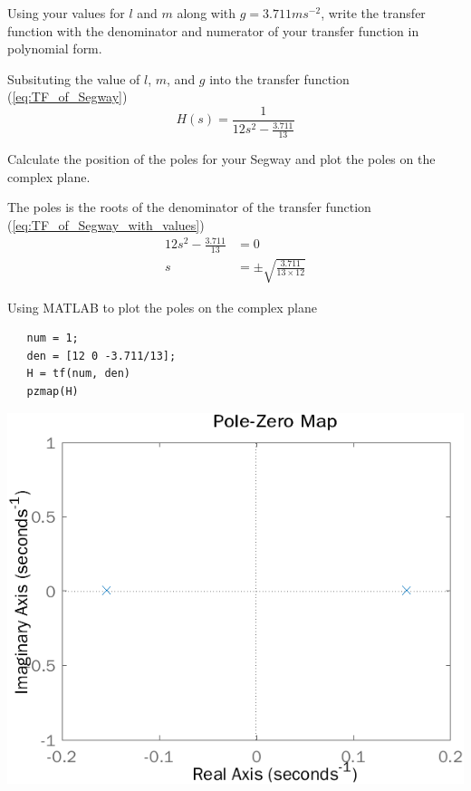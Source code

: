 \begin{questions}
\question[1E]
Using your values for $l$ and $m$ along with $g=3.711 ms^{-2}$, write the transfer function with the denominator and numerator of your transfer function in polynomial form.

\begin{solution}
   Subsituting the value of $l$, $m$, and $g$ into the transfer function (\ref{eq:TF_of_Segway})
   \begin{equation}\label{eq:TF_of_Segway_with_values}
   H(s) = \frac{1}{12s^2-\frac{3.711}{13}}
   \end{equation}
\end{solution}

\question[1E]
Calculate the position of the poles for your Segway and plot the poles on the complex plane.

\begin{solution}
   The poles is the roots of the denominator of the transfer function (\ref{eq:TF_of_Segway_with_values})
   \begin{align*}
   12s^2-\frac{3.711}{13} &= 0 \\
   s &= \pm\sqrt{\frac{3.711}{13\times12}}
   \end{align*}

   Using MATLAB to plot the poles on the complex plane
   \begin{verbatim}
   num = 1;
   den = [12 0 -3.711/13];
   H = tf(num, den)
   pzmap(H)
   \end{verbatim}
   \begin{minipage}[htbp]{\linewidth}
      \centering
      \includegraphics[scale=0.8]{figures/D.png}
      \label{fig:poles_of_H}
   \end{minipage}
\end{solution}

\setcounter{lastquestioncounter}{\value{question}}
\end{questions}

